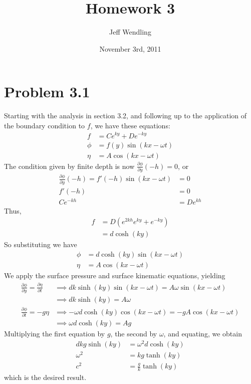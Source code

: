 \documentclass[12pt]{article}
\title{Homework 3}
\author{Jeff Wendling}
\date{November 3rd, 2011}
\newcommand{\eq}[1]{\begin{align*}#1\end{align*}}
\newcommand{\p}[2]{\frac{\partial#1}{\partial#2}}
\begin{document}
\maketitle
\section*{Problem 3.1} Starting with the analysis in section 3.2, and following up to the application of the boundary condition to $f$, we have these equations:
\eq{
	f &= Ce^{ky} + De^{-ky}\\
	\phi &= f(y)\sin(kx - \omega t)\\
	\eta &= A\cos(kx - \omega t)
}
The condition given by finite depth is now $\p{\phi}{y}(-h) = 0$, or
\eq{
	\p{\phi}{y}(-h) = f'(-h)\sin(kx - \omega t) &= 0\\
	f'(-h) &= 0\\
	Ce^{-kh} &= De^{kh}
}
Thus,
\eq{
	f &= D(e^{2kh}e^{ky} + e^{-ky})\\
	&= d\cosh(ky)
}
So substituting we have
\eq{
	\phi &= d\cosh(ky)\sin(kx - \omega t)\\
	\eta &= A\cos(kx - \omega t)
}
We apply the surface pressure and surface kinematic equations, yielding
\eq{
	\p{\phi}{y} = \p{\eta}{t} &\implies dk\sinh(ky)\sin(kx - \omega t) = A\omega\sin(kx - \omega t)\\
	&\implies dk\sinh(ky) = A\omega\\
	\p{\phi}{t} = -g\eta &\implies -\omega d\cosh(ky)\cos(kx - \omega t) = -gA\cos(kx - \omega t)\\
	&\implies \omega d\cosh(ky) = Ag
}
Multiplying the first equation by $g$, the second by $\omega$, and equating, we obtain
\eq{
	dkg\sinh(ky) &= \omega^2 d \cosh(ky)\\
	\omega^2 &= kg\tanh(ky)\\
	c^2 &= \frac{g}{k}\tanh(ky)
}
which is the desired result.
\end{document}
